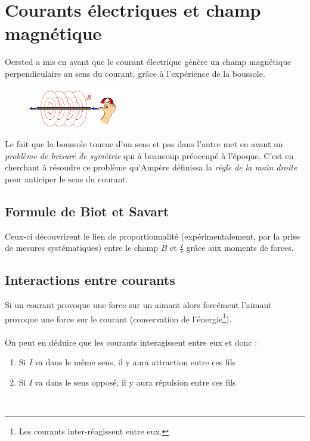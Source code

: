 \documentclass	[11pt, a4paper, openany]{book}
\begin{document}
\section{Courants électriques et champ magnétique}
Oersted a mis en avant que le courant électrique génère un champ magnétique perpendiculaire au sens du courant, grâce à l'expérience de la boussole.\\

\begin{figure}
\includegraphics[width=4cm]{magneto/image0.png}
\end{figure}

Le fait que la boussole tourne d'un sens et pas dans l'autre met en avant un \textit{problème de brisure de symétrie} qui à beaucoup préoccupé à l'époque. C'est en cherchant à résoudre ce problème qu'Ampère définissa la \textit{règle de la main droite} pour anticiper le sens du courant.

\subsection{Formule de Biot et Savart}
Ceux-ci découvrirent le lien de proportionnalité (expérimentalement, par la prise de mesures systématiques) entre le champ $B$ et $\frac{I}{r}$ grâce aux moments de forces.

\subsection{Interactions entre courants}
Si un courant provoque une force sur un aimant alors forcément l'aimant provoque une force sur le courant (conservation de l'énergie\footnote{Les courants inter-réagissent entre eux.}).\\\\
On peut en déduire que les courants interagissent entre eux et donc :
\begin{enumerate}
\item Si \textit{I} va dans le même sens, il y aura attraction entre ces fils
\item Si \textit{I} va dans le sens opposé, il y aura répulsion entre ces fils
\end{enumerate}
\ 
\end{document}
